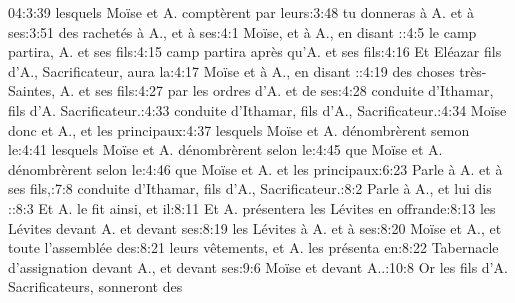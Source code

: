 \begin{multicols}{3}
{04:3:39	lesquels Moïse et A. comptèrent par leurs:3:48	tu donneras à A. et à ses:3:51	des rachetés à A., et à ses:4:1	Moïse, et à A., en disant ::4:5	le camp partira, A. et ses fils:4:15	camp partira après qu'A. et ses fils:4:16	Et Eléazar fils d'A., Sacrificateur, aura la:4:17	Moïse et à A., en disant ::4:19	des choses très-Saintes, A. et ses fils:4:27	par les ordres d'A. et de ses:4:28	conduite d'Ithamar, fils d'A. Sacrificateur.:4:33	conduite d'Ithamar, fils d'A., Sacrificateur.:4:34	Moïse donc et A., et les principaux:4:37	lesquels Moïse et A. dénombrèrent semon le:4:41	lesquels Moïse et A. dénombrèrent selon le:4:45	que Moïse et A. dénombrèrent selon le:4:46	que Moïse et A. et les principaux:6:23	Parle à A. et à ses fils,:7:8	conduite d'Ithamar, fils d'A., Sacrificateur.:8:2	Parle à A., et lui dis ::8:3	Et A. le fit ainsi, et il:8:11	Et A. présentera les Lévites en offrande:8:13	les Lévites devant A. et devant ses:8:19	les Lévites à A. et à ses:8:20	Moïse et A., et toute l'assemblée des:8:21	leurs vêtements, et A. les présenta en:8:22	Tabernacle d'assignation devant A., et devant ses:9:6	Moïse et devant A..:10:8	Or les fils d'A. Sacrificateurs, sonneront des\newline
}
\end{multicols}

